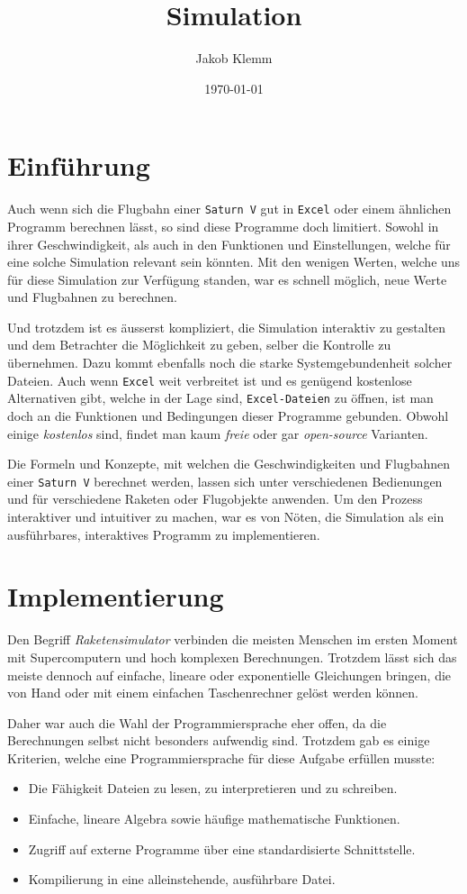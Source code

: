 \documentclass[11pt]{article}
\author{Jakob Klemm}
\date{\today}
\title{Simulation}
\begin{document}
\maketitle
\tableofcontents

\section{Einführung}
\label{sec:org87e98c1}
Auch wenn sich die Flugbahn einer \texttt{Saturn V} gut in \texttt{Excel} oder einem ähnlichen
Programm berechnen lässt, so sind diese Programme doch limitiert. Sowohl in
ihrer Geschwindigkeit, als auch in den Funktionen und Einstellungen, welche für
eine solche Simulation relevant sein könnten. Mit den wenigen Werten, welche uns
für diese Simulation zur Verfügung standen, war es schnell möglich, neue Werte
und Flugbahnen zu berechnen.

Und trotzdem ist es äusserst kompliziert, die Simulation interaktiv zu gestalten
und dem Betrachter die Möglichkeit zu geben, selber die Kontrolle zu übernehmen.
Dazu kommt ebenfalls noch die starke Systemgebundenheit solcher Dateien. Auch
wenn \texttt{Excel} weit verbreitet ist und es genügend kostenlose Alternativen gibt,
welche in der Lage sind, \texttt{Excel-Dateien} zu öffnen, ist man doch an die Funktionen
und Bedingungen dieser Programme gebunden. Obwohl einige \emph{kostenlos} sind, findet
man kaum \emph{freie} oder gar \emph{open-source} Varianten.

Die Formeln und Konzepte, mit welchen die Geschwindigkeiten und Flugbahnen einer
\texttt{Saturn V} berechnet werden, lassen sich unter verschiedenen Bedienungen und für
verschiedene Raketen oder Flugobjekte anwenden. Um den Prozess interaktiver und
intuitiver zu machen, war es von Nöten, die Simulation als ein ausführbares,
interaktives Programm zu implementieren.
\section{Implementierung}
\label{sec:org4d8d98f}
Den Begriff \emph{Raketensimulator} verbinden die meisten Menschen im ersten Moment mit
Supercomputern und hoch komplexen Berechnungen. Trotzdem lässt sich das meiste
dennoch auf einfache, lineare oder exponentielle Gleichungen bringen, die von
Hand oder mit einem einfachen Taschenrechner gelöst werden können.

Daher war auch die Wahl der Programmiersprache eher offen, da die Berechnungen
selbst nicht besonders aufwendig sind. Trotzdem gab es einige Kriterien, welche
eine Programmiersprache für diese Aufgabe erfüllen musste:
\begin{itemize}
\item Die Fähigkeit Dateien zu lesen, zu interpretieren und zu schreiben.
\item Einfache, lineare Algebra sowie häufige mathematische Funktionen.
\item Zugriff auf externe Programme über eine standardisierte Schnittstelle.
\item Kompilierung in eine alleinstehende, ausführbare Datei.
\end{itemize}
\end{document}
